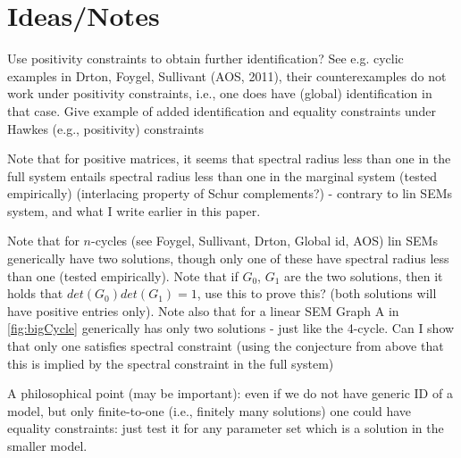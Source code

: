 \documentclass[accepted]{uai2021} %
\begin{document}

\section{Ideas/Notes}

Use positivity constraints to obtain further identification? See e.g. cyclic 
examples in Drton, Foygel, Sullivant (AOS, 2011), their counterexamples do not 
work under positivity constraints, i.e., one does have (global) identification 
in that case. Give example of added identification and equality constraints 
under Hawkes (e.g., positivity) constraints

Note that for positive matrices, it seems that spectral radius less than one in 
the full system entails spectral radius less than one in the marginal system 
(tested empirically) (interlacing property of Schur complements?) - contrary to 
lin SEMs system, and what I write earlier in this paper.

Note that for $n$-cycles (see Foygel, Sullivant, Drton, Global id, AOS) lin 
SEMs generically have two solutions, though only one of these have spectral 
radius less than one (tested empirically). Note that if $G_0$, $G_1$ are the 
two solutions, then it holds that $det(G_0)det(G_1) = 1$, use this to prove 
this? (both solutions will have positive entries only). Note also that for a 
linear SEM Graph A in \ref{fig:bigCycle} generically has only two solutions - 
just like the 4-cycle. Can I show that only one satisfies spectral constraint 
(using the conjecture from above that this is implied by the spectral 
constraint in the full system)

A philosophical point (may be important): even if we do not have generic ID of 
a model, but only finite-to-one (i.e., finitely many solutions) one could have 
equality constraints: just test it for any parameter set which is a solution in 
the smaller model.
\end{document}
